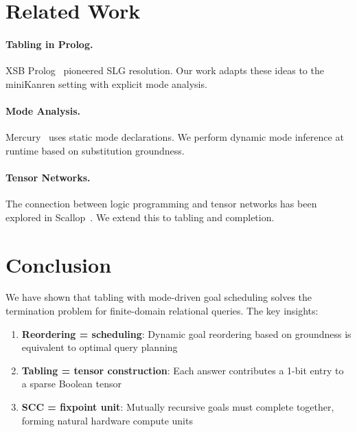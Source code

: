 \documentclass[11pt,a4paper]{article}
\begin{document}
\section{Related Work}
\label{sec:related_chirho}

\paragraph{Tabling in Prolog.}
XSB Prolog~\cite{swift1999} pioneered SLG resolution. Our work adapts these
ideas to the miniKanren setting with explicit mode analysis.

\paragraph{Mode Analysis.}
Mercury~\cite{somogyi1996} uses static mode declarations. We perform dynamic
mode inference at runtime based on substitution groundness.

\paragraph{Tensor Networks.}
The connection between logic programming and tensor networks has been explored
in Scallop~\cite{scallop2023}. We extend this to tabling and completion.

\section{Conclusion}
\label{sec:conclusion_chirho}

We have shown that tabling with mode-driven goal scheduling solves the
termination problem for finite-domain relational queries. The key insights:

\begin{enumerate}
  \item \textbf{Reordering = scheduling}: Dynamic goal reordering based on
        groundness is equivalent to optimal query planning
  \item \textbf{Tabling = tensor construction}: Each answer contributes a
        1-bit entry to a sparse Boolean tensor
  \item \textbf{SCC = fixpoint unit}: Mutually recursive goals must complete
        together, forming natural hardware compute units
\end{enumerate}
\end{document}
